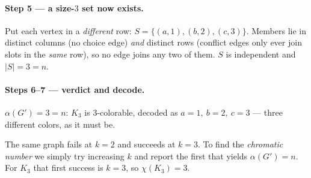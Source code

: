 \documentclass[11pt]{article}
\begin{document}
\paragraph{Step 5 --- a size-$3$ set now exists.} Put each vertex in a
\emph{different} row: $S=\{(a,1),(b,2),(c,3)\}$. Members lie in distinct columns
(no choice edge) \emph{and} distinct rows (conflict edges only ever join slots in
the \emph{same} row), so no edge joins any two of them. $S$ is independent and
$|S|=3=n$.

\begin{center}
\end{center}

\paragraph{Steps 6--7 --- verdict and decode.} $\alpha(G')=3=n$: $K_3$ is
$3$-colorable, decoded as $a=1,\ b=2,\ c=3$ --- three different colors, as it must
be.

\begin{center}
\end{center}

\begin{tcolorbox}[colback=gray!6,colframe=gray!55,title=\textbf{Lesson}]
The same graph fails at $k=2$ and succeeds at $k=3$. To find the \emph{chromatic
number} we simply try increasing $k$ and report the first that yields
$\alpha(G')=n$. For $K_3$ that first success is $k=3$, so $\chi(K_3)=3$.
\end{tcolorbox}
\end{document}
